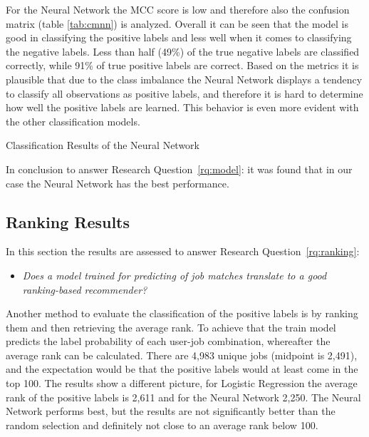 For the Neural Network the MCC score is low and therefore also the confusion matrix (table \ref{tab:cmnn}) is analyzed.
Overall it can be seen that the model is good in classifying the positive labels and less well when it comes to classifying the negative labels.
Less than half (49\%) of the true negative labels are classified correctly, while 91\% of true positive labels are correct.
Based on the metrics it is plausible that due to the class imbalance the Neural Network displays a tendency to classify all observations as positive labels, and therefore it is hard to determine how well the positive labels are learned.
This behavior is even more evident with the other classification models.

\begin{table}[h]
\begin{footnotesize}

\end{footnotesize}
\caption{\label{tab:cmnn} \footnotesize{Classification Results of the Neural Network}}
\end{table}

In conclusion to answer Research Question~\ref{rq:model}: it was found that in our case the Neural Network has the best performance.

\subsection{Ranking Results}
\label{ssec:rr}

In this section the results are assessed to answer Research Question~\ref{rq:ranking}:
\begin{itemize}
	\item[] \em Does a model trained for predicting of job matches translate to a good ranking-based recommender?
\end{itemize}

\noindent Another method to evaluate the classification of the positive labels is by ranking them and then retrieving the average rank.
To achieve that the train model predicts the label probability of each user-job combination, whereafter the average rank can be calculated.
There are 4,983 unique jobs (midpoint is 2,491), and the expectation would be that the positive labels would at least come in the top 100. 
The results show a different picture, for Logistic Regression the average rank of the positive labels is 2,611 and for the Neural Network 2,250.
The Neural Network performs best, but the results are not significantly better than the random selection and definitely not close to an average rank below 100.

